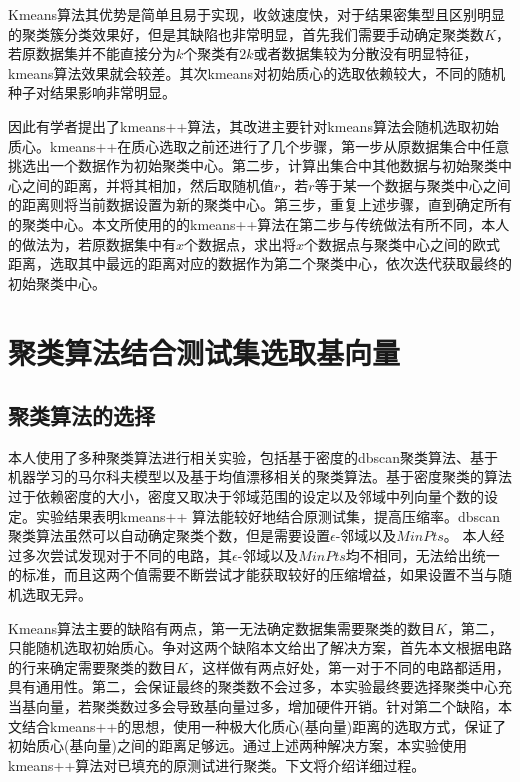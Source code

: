 Kmeans算法其优势是简单且易于实现，收敛速度快，对于结果密集型且区别明显的聚类簇分类效果好，但是其缺陷也非常明显，首先我们需要手动确定聚类数$K$，若原数据集并不能直接分为$k$个聚类有$2k$或者数据集较为分散没有明显特征，kmeans算法效果就会较差。其次kmeans对初始质心的选取依赖较大，不同的随机种子对结果影响非常明显。

因此有学者提出了kmeans++算法，其改进主要针对kmeans算法会随机选取初始质心。kmeans++在质心选取之前还进行了几个步骤，第一步从原数据集合中任意挑选出一个数据作为初始聚类中心。第二步，计算出集合中其他数据与初始聚类中心之间的距离，并将其相加，然后取随机值$r$，若$r$等于某一个数据与聚类中心之间的距离则将当前数据设置为新的聚类中心。第三步，重复上述步骤，直到确定所有的聚类中心。本文所使用的的kmeans++算法在第二步与传统做法有所不同，本人的做法为，若原数据集中有$x$个数据点，求出将$x$个数据点与聚类中心之间的欧式距离，选取其中最远的距离对应的数据作为第二个聚类中心，依次迭代获取最终的初始聚类中心。

\section{聚类算法结合测试集选取基向量}

\subsection{聚类算法的选择}

本人使用了多种聚类算法进行相关实验，包括基于密度的dbscan聚类算法、基于机器学习的马尔科夫模型以及基于均值漂移相关的聚类算法。基于密度聚类的算法过于依赖密度的大小，密度又取决于邻域范围的设定以及邻域中列向量个数的设定。实验结果表明kmeans++ 算法能较好地结合原测试集，提高压缩率。dbscan聚类算法虽然可以自动确定聚类个数，但是需要设置$\epsilon$-邻域以及$MinPts$。 本人经过多次尝试发现对于不同的电路，其$\epsilon$-邻域以及$MinPts$均不相同，无法给出统一的标准，而且这两个值需要不断尝试才能获取较好的压缩增益，如果设置不当与随机选取无异。

Kmeans算法主要的缺陷有两点，第一无法确定数据集需要聚类的数目$K$，第二，只能随机选取初始质心。争对这两个缺陷本文给出了解决方案，首先本文根据电路的行来确定需要聚类的数目$K$，这样做有两点好处，第一对于不同的电路都适用，具有通用性。第二，会保证最终的聚类数不会过多，本实验最终要选择聚类中心充当基向量，若聚类数过多会导致基向量过多，增加硬件开销。针对第二个缺陷，本文结合kmeans++的思想，使用一种极大化质心(基向量)距离的选取方式，保证了初始质心(基向量)之间的距离足够远。通过上述两种解决方案，本实验使用kmeans++算法对已填充的原测试进行聚类。下文将介绍详细过程。

